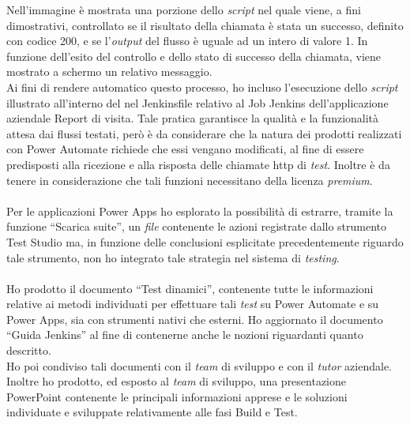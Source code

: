 \newline Nell'immagine è mostrata una porzione dello \emph{script} nel quale viene, a fini dimostrativi, controllato se il risultato della chiamata è stata un successo, definito con codice 200, e se l'\emph{output} del flusso è uguale ad un intero di valore 1.
In funzione dell'esito del controllo e dello stato di successo della chiamata, viene mostrato a schermo un relativo messaggio.\\
Ai fini di rendere automatico questo processo, ho incluso l'esecuzione dello \emph{script} illustrato all'interno del nel Jenkinsfile relativo al Job Jenkins dell'applicazione aziendale Report di visita.
Tale pratica garantisce la qualità e la funzionalità attesa dai flussi testati, però è da considerare che la natura dei prodotti realizzati con Power Automate richiede che essi vengano modificati, al fine di essere predisposti alla ricezione e alla risposta delle chiamate \gls{http} di \emph{test}.
Inoltre è da tenere in considerazione che tali funzioni necessitano della licenza \emph{premium}.\\\\
Per le applicazioni Power Apps ho esplorato la possibilità di estrarre, tramite la funzione “Scarica suite”, un \emph{file} contenente le azioni registrate dallo strumento Test Studio ma, in funzione delle conclusioni esplicitate precedentemente riguardo tale strumento, non ho integrato tale strategia nel sistema di \emph{testing}.\\\\
Ho prodotto il documento “Test dinamici”, contenente tutte le informazioni relative ai metodi individuati per effettuare tali \emph{test} su Power Automate e su Power Apps, sia con strumenti nativi che esterni. Ho aggiornato il documento “Guida Jenkins” al fine di contenerne anche le nozioni riguardanti quanto descritto.\\
Ho poi condiviso tali documenti con il \emph{team} di sviluppo e con il \emph{\emph{tutor}} aziendale.\\
Inoltre ho prodotto, ed esposto al \emph{team} di sviluppo, una presentazione PowerPoint contenente le principali informazioni apprese e le soluzioni individuate e sviluppate relativamente alle fasi Build e Test. 


